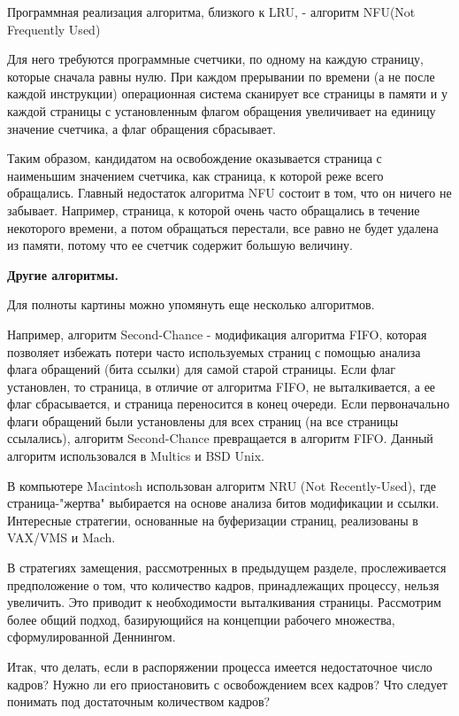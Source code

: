 Программная реализация алгоритма, близкого к LRU, - алгоритм NFU(Not Frequently Used)

Для него требуются программные счетчики, по одному на каждую страницу, которые сначала равны нулю. При каждом прерывании по времени (а не после каждой инструкции) операционная система сканирует все страницы в памяти и у каждой страницы с установленным флагом обращения увеличивает на единицу значение счетчика, а флаг обращения сбрасывает.

Таким образом, кандидатом на освобождение оказывается страница с наименьшим значением счетчика, как страница, к которой реже всего обращались. Главный недостаток алгоритма NFU состоит в том, что он ничего не забывает. Например, страница, к которой очень часто обращались в течение некоторого времени, а потом обращаться перестали, все равно не будет удалена из памяти, потому что ее счетчик содержит большую величину.

\begin{center}{\bfseries Другие алгоритмы.}
\end{center}

Для полноты картины можно упомянуть еще несколько алгоритмов.

Например, алгоритм Second-Chance - модификация алгоритма FIFO, которая позволяет избежать потери часто используемых страниц с помощью анализа флага обращений (бита ссылки) для самой старой страницы. Если флаг установлен, то страница, в отличие от алгоритма FIFO, не выталкивается, а ее флаг сбрасывается, и страница переносится в конец очереди. Если первоначально флаги обращений были установлены для всех страниц (на все страницы ссылались), алгоритм Second-Chance превращается в алгоритм FIFO. Данный алгоритм использовался в Multics и BSD Unix.

В компьютере Macintosh использован алгоритм NRU (Not Recently-Used), где страница-"жертва" выбирается на основе анализа битов модификации и ссылки. Интересные стратегии, основанные на буферизации страниц, реализованы в VAX/VMS и Mach.

В стратегиях замещения, рассмотренных в предыдущем разделе, прослеживается предположение о том, что количество кадров, принадлежащих процессу, нельзя увеличить. Это приводит к необходимости выталкивания страницы. Рассмотрим более общий подход, базирующийся на концепции рабочего множества, сформулированной Деннингом.

Итак, что делать, если в распоряжении процесса имеется недостаточное число кадров? Нужно ли его приостановить с освобождением всех кадров? Что следует понимать под достаточным количеством кадров?

